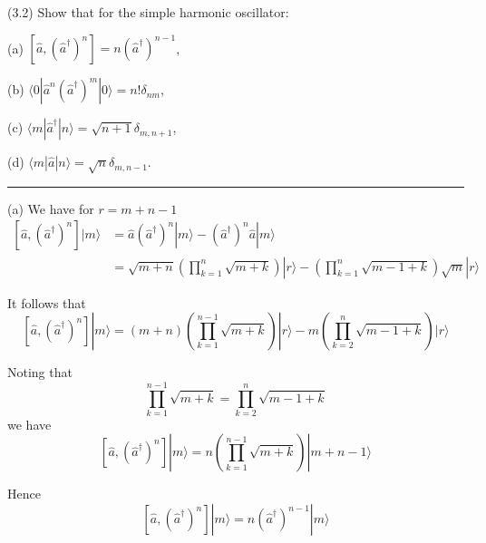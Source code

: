 \documentclass[12pt]{article}
\begin{document}
(3.2)
Show that for the simple harmonic oscillator:

\bigskip
(a) $\left[\hat a,(\hat a^\dag)^n\right]=n(\hat a^\dag)^{n-1}$,

(b) $\langle0|\hat a^n(\hat a^\dag)^m|0\rangle=n!\delta_{nm}$,

(c) $\langle m|\hat a^\dag|n\rangle=\sqrt{n+1}\delta_{m,n+1}$,

(d) $\langle m|\hat a|n\rangle=\sqrt{n}\delta_{m,n-1}$.

\bigskip
\hrule

\bigskip
(a) We have for $r=m+n-1$
\begin{align*}
\left[\hat a,(\hat a^\dag)^n\right]|m\rangle
&=\hat a(\hat a^\dag)^n|m\rangle-(\hat a^\dag)^n\hat a|m\rangle
\\
&=\sqrt{m+n}\left(\prod_{k=1}^n\sqrt{m+k}\right)|r\rangle
-\left(\prod_{k=1}^n\sqrt{m-1+k}\right)\sqrt{m}|r\rangle
\end{align*}

It follows that
\begin{equation*}
\left[\hat a,(\hat a^\dag)^n\right]|m\rangle
=(m+n)\left(\prod_{k=1}^{n-1}\sqrt{m+k}\right)|r\rangle
-m\left(\prod_{k=2}^n\sqrt{m-1+k}\right)|r\rangle
\end{equation*}

Noting that
\begin{equation*}
\prod_{k=1}^{n-1}\sqrt{m+k}=\prod_{k=2}^n\sqrt{m-1+k}
\end{equation*}
we have
\begin{equation*}
\left[\hat a,(\hat a^\dag)^n\right]|m\rangle
=n\left(\prod_{k=1}^{n-1}\sqrt{m+k}\right)|m+n-1\rangle
\end{equation*}

Hence
\begin{equation*}
\left[\hat a,(\hat a^\dag)^n\right]|m\rangle=n(\hat a^\dag)^{n-1}|m\rangle
\end{equation*}
\end{document}
